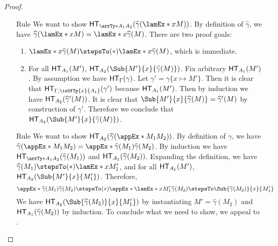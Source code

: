 \documentclass[letterpaper]{article}
\begin{document}
\begin{proof}
\begin{enumerate}
  \item [Rule \ruleref{sta:abs}] We want to show $\HT[\arrTy*{A_1}{A_2}](\widehat{\gamma}(\lamEx*{x}{M}))$. By definition of $\widehat{\gamma}$, we have $\widehat{\gamma}(\lamEx*{x}{M}) = \lamEx*{x}{\widehat{\gamma}(M)}$. There are two proof goals:
  \begin{enumerate}
    \item $\lamEx*{x}{\widehat{\gamma}(M)} \stepsTo(*) \lamEx*{x}{\widehat{\gamma}(M)}$, which is immediate.
    \item For all $\HT[A_1](M')$, $\HT[A_2](\Sub{M'}{x}{\widehat{\gamma}(M)})$. Fix arbitrary $\HT[A_1](M')$. By assumption we have $\HT[\Gamma](\gamma)$. Let $\gamma' = \gamma\{x \mapsto M'\}$. Then it is clear that $\HT[\Gamma, \isOfTp{x}{A_1}](\gamma')$ because $\HT[A_1](M')$. Then by induction we have $\HT[A_2](\widehat{\gamma}'(M))$. It is clear that $\Sub{M'}{x}{\widehat{\gamma}(M)} = \widehat{\gamma}'(M)$ by construction of $\gamma'$. Therefore we conclude that $\HT[A_2](\Sub{M'}{x}{\widehat{\gamma}(M)})$.
  \end{enumerate}
  \item [Rule \ruleref{sta:app}] We want to show $\HT[A_2](\widehat{\gamma}(\appEx*{M_1}{M_2}))$. By definition of $\widehat{\gamma}$, we have $\widehat{\gamma}(\appEx*{M_1}{M_2}) = \appEx*{\widehat{\gamma}(M_1)}{\widehat{\gamma}(M_2)}$. By induction we have $\HT[\arrTy*{A_1}{A_2}](\widehat{\gamma}(M_1))$ and $\HT[A_1](\widehat{\gamma}(M_2))$. Expanding the definition, we have $\widehat{\gamma}(M_1) \stepsTo(*) \lamEx*{x}{M_1'}$, and for all $\HT[A_1](M')$, $\HT[A_2](\Sub{M'}{x}{M_1'})$. Therefore, $$\appEx*{\widehat{\gamma}(M_1)}{\widehat{\gamma}(M_2)} \stepsTo(*) \appEx*{\lamEx*{x}{M_1'}}{\widehat{\gamma}(M_2)} \stepsTo \Sub{\widehat{\gamma}(M_2)}{x}{M_1'}$$ We have $\HT[A_2]{(\Sub{\widehat{\gamma}(M_2)}{x}{M_1'})}$ by instantiating $M' = \widehat{\gamma}(M_2)$ and $\HT[A_1](\widehat{\gamma}(M_2))$ by induction. To conclude what we need to show, we appeal to .
\end{enumerate}

\end{proof}
\end{document}
